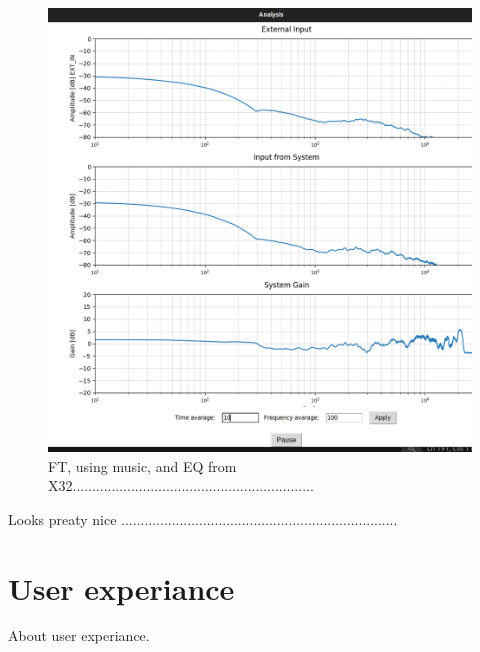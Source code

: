 \begin{figure}[H]
	\centering
	\includegraphics[width=0.6
	\linewidth]{Figures/Coro_FT_music_EQX32.png}
	\caption{FT, using music, and EQ from X32..............................................................}
	\label{fig:Coro_FT_music}
\end{figure}

Looks preaty nice .......................................................................


\section{User experiance}

About user experiance.


